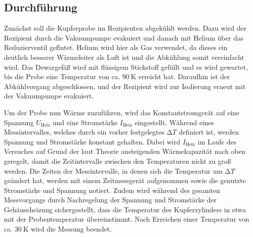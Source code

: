 \subsection{Durchführung}
\label{sec:durchführung}

Zunächst soll die Kupferprobe im Rezipienten abgekühlt werden.
Dazu wird der Rezipient durch die Vakuumpumpe evakuiert und danach mit Helium über das Reduzierventil geflutet.
Helium wird hier als Gas verwendet, da dieses ein deutlich besserer Wärmeleiter als Luft ist und die Abkühlung somit vereinfacht wird.
Das Dewargefäß wird mit flüssigem Stickstoff gefüllt und es wird gewartet, bis die Probe eine Temperatur von ca. $\SI{90}{\kelvin}$ erreicht hat.
Daraufhin ist der Abkühlvorgang abgeschlossen, und der Rezipient wird zur Isolierung erneut mit der Vakuumpumpe evakuiert.

Um der Probe nun Wärme zuzuführen, wird das Konstantstromgerät auf eine Spannung $U_{\text{Heiz}}$ und eine Stromstärke $I_{\text{Heiz}}$ eingestellt.
Während eines Messintervalles, welches durch ein vorher festgelegtes $\increment T$ definiert ist, werden Spannung und Stromstärke konstant gehalten.
Dabei wird $I_{\text{Heiz}}$ im Laufe des Versuches auf Grund der laut Theorie ansteigenden Wärmekapazität nach oben geregelt, damit die Zeitintervalle zwischen den Temperaturen nicht zu groß werden.
Die Zeiten der Messintervalle, in denen sich die Temperatur um $\increment T$ geändert hat, werden mit einem Zeitmessgerät aufgenommen sowie die genutzte Stromstärke und Spannung notiert.
Zudem wird während des gesamten Messvorgangs durch Nachregelung der Spannung und Stromstärke der Gehäuseheizung sichergestellt, dass die Temperatur des Kupferzylinders in etwa mit der Probentemperatur übereinstimmt.
Nach Erreichen einer Temperatur von ca. $\SI{30}{\kelvin}$ wird die Messung beendet.
